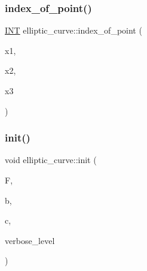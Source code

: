 \subsubsection{\texorpdfstring{index\+\_\+of\+\_\+point()}{index\_of\_point()}}
{\footnotesize\ttfamily \mbox{\hyperlink{galois_8h_a09fddde158a3a20bd2dcadb609de11dc}{I\+NT}} elliptic\+\_\+curve\+::index\+\_\+of\+\_\+point (\begin{DoxyParamCaption}\item[{\mbox{\hyperlink{galois_8h_a09fddde158a3a20bd2dcadb609de11dc}{I\+NT}}}]{x1,  }\item[{\mbox{\hyperlink{galois_8h_a09fddde158a3a20bd2dcadb609de11dc}{I\+NT}}}]{x2,  }\item[{\mbox{\hyperlink{galois_8h_a09fddde158a3a20bd2dcadb609de11dc}{I\+NT}}}]{x3 }\end{DoxyParamCaption})}

\mbox{\label{classelliptic__curve_a0146cb7d2585f1e15e49d77a7496190f}} 
\subsubsection{\texorpdfstring{init()}{init()}}
{\footnotesize\ttfamily void elliptic\+\_\+curve\+::init (\begin{DoxyParamCaption}\item[{\mbox{\hyperlink{classfinite__field}{finite\+\_\+field}} $\ast$}]{F,  }\item[{\mbox{\hyperlink{galois_8h_a09fddde158a3a20bd2dcadb609de11dc}{I\+NT}}}]{b,  }\item[{\mbox{\hyperlink{galois_8h_a09fddde158a3a20bd2dcadb609de11dc}{I\+NT}}}]{c,  }\item[{\mbox{\hyperlink{galois_8h_a09fddde158a3a20bd2dcadb609de11dc}{I\+NT}}}]{verbose\+\_\+level }\end{DoxyParamCaption})}

\mbox{\label{classelliptic__curve_aab796461061a1041a6b17a9866153544}} 
